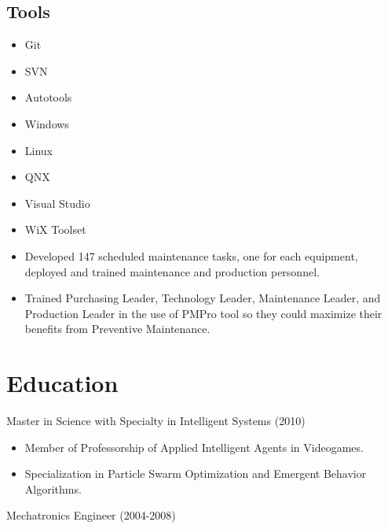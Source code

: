 \documentclass{scrartcl}
\begin{document}
\begin{minipage}[t]{0.28\textwidth}
\begin{flushright}
	
	\subsection*{Tools}
		\begin{itemize}[noitemsep]
			\item Git
			\item SVN
			\item Autotools
			\item Windows
			\item Linux 
			\item QNX
			\item Visual Studio
			\item WiX Toolset
		\end{itemize}
	\end{flushright}
\end{minipage}

\newpage


\begin{itemize}[noitemsep]
	\item Developed 147 scheduled maintenance tasks, one for each equipment, deployed and trained maintenance and production personnel.  
	\item Trained Purchasing Leader, Technology Leader, Maintenance Leader, and Production Leader in the use of PMPro tool so they could maximize their benefits from Preventive Maintenance.  
\end{itemize}

\section*{Education}
Master in Science with Specialty in Intelligent Systems (2010)
\begin{itemize}[leftmargin=*]
	\setlength{\itemsep}{1pt}
  \setlength{\parskip}{0pt}
  \setlength{\parsep}{0pt}
	\item Member of Professorship of Applied Intelligent Agents in Videogames.
	\item Specialization in Particle Swarm Optimization and Emergent Behavior Algorithms.
\end{itemize}

\noindent
{}
Mechatronics Engineer (2004-2008) 
\end{document}
